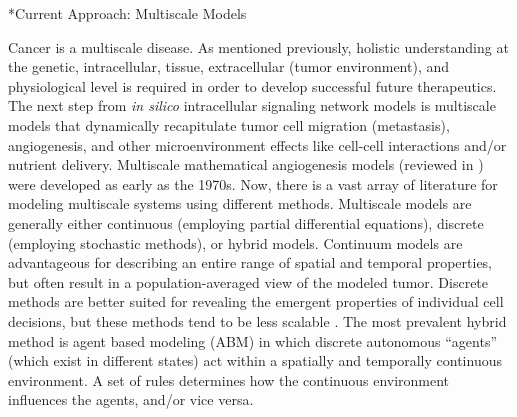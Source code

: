 \documentclass[12pt]{article}
\makeatletter
\renewcommand\section{\@startsection
	{subsection}{2}{0mm}
	{-0.2in}
	{0.05\baselineskip}
	{\normalfont\large\bfseries}}
\makeatother
\begin{document}
\section*{Current Approach: Multiscale Models}

Cancer is a multiscale disease. As mentioned previously, holistic understanding at the genetic, intracellular, tissue, extracellular (tumor environment), and physiological level is required in order to develop successful future therapeutics. The next step from \textit{in silico} intracellular signaling network models is multiscale models that dynamically recapitulate tumor cell migration (metastasis), angiogenesis, and other microenvironment effects like cell-cell interactions and/or nutrient delivery. Multiscale mathematical angiogenesis models (reviewed in \cite{Qutub2009}) were developed as early as the 1970s. Now, there is a vast array of literature for modeling multiscale systems using different methods. Multiscale models \cite{Deisboeck2011} are generally either continuous (employing partial differential equations), discrete (employing stochastic methods), or hybrid models. Continuum models \cite{Swanson2003,Massey2012} are advantageous for describing an entire range of spatial and temporal properties, but often result in a population-averaged view of the modeled tumor. Discrete methods \cite{Chavali2008,Hattne2005} are better suited for revealing the emergent properties of individual cell decisions, but these methods tend to be less scalable \cite{Chakrabarti2012}. The most prevalent hybrid method is agent based modeling (ABM) in which discrete autonomous \textquotedblleft agents\textquotedblright $\:$ (which exist in different states) act within a spatially and temporally continuous environment. A set of rules determines how the continuous environment influences the agents, and/or vice versa.
	
\end{document}
